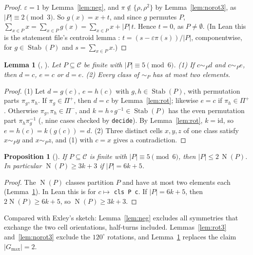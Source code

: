 \documentclass[11pt]{amsart}
\theoremstyle{plain}
\newtheorem{lemma}[theorem]{Lemma}
\newtheorem{proposition}[theorem]{Proposition}
\theoremstyle{definition}
\newcommand{\C}{\mathcal{C}}
\newcommand{\Stab}{\operatorname{Stab}}
\newcommand{\cls}{\operatorname{N}}
\begin{document}
\begin{proof}
$\varepsilon=1$ by Lemma~\ref{lem:neg}, and $\pi\notin\{\rho,\rho^2\}$ by Lemma~\ref{lem:norot3}, as $|P|\equiv2\pmod3$. So $g(x)=x+t$, and since $g$ permutes $P$, $\sum_{x\in P}x=\sum_{x\in P}g(x)=\sum_{x\in P}x+|P|\,t$. Hence $t=0$, as $P\neq\emptyset$. (In Lean this is the statement file's centroid lemma : $t=(s-\varepsilon\pi(s))/|P|$, componentwise, for $g\in\Stab(P)$ and $s=\sum_{x\in P}x$.)
\end{proof}

\begin{lemma}[, ]\label{lem:three}
Let $P\subseteq\C$ be finite with $|P|\equiv5\pmod6$. (1) If $c\sim_P d$ and $c\sim_P e$, then $d=c$, $e=c$ or $d=e$. (2) Every class of $\sim_P$ has at most two elements.
\end{lemma}

\begin{proof}
(1) Let $d=g(c)$, $e=h(c)$ with $g,h\in\Stab(P)$, with permutation parts $\pi_g,\pi_h$. If $\pi_g\in\Pi^+$, then $d=c$ by Lemma~\ref{lem:rot}; likewise $e=c$ if $\pi_h\in\Pi^+$. Otherwise $\pi_g,\pi_h\in\Pi^-$, and $k=h\circ g^{-1}\in\Stab(P)$ has the even permutation part $\pi_h\pi_g^{-1}$ (, nine cases checked by \texttt{decide}). By Lemma~\ref{lem:rot}, $k=\mathrm{id}$, so $e=h(c)=k(g(c))=d$.
(2) Three distinct cells $x,y,z$ of one class satisfy $x\sim_P y$ and $x\sim_P z$, and (1) with $c=x$ gives a contradiction.
\end{proof}

\begin{proposition}[]\label{prop:lower}
If $P\subseteq\C$ is finite with $|P|\equiv5\pmod6$, then $|P|\le2\,\cls(P)$. In particular $\cls(P)\ge3k+3$ if $|P|=6k+5$.
\end{proposition}

\begin{proof}
The $\cls(P)$ classes partition $P$ and have at most two elements each (Lemma~\ref{lem:three}). In Lean this is  for $c\mapsto$ \texttt{cls P c}. If $|P|=6k+5$, then $2\cls(P)\ge6k+5$, so $\cls(P)\ge3k+3$.
\end{proof}

Compared with Exley's sketch: Lemma~\ref{lem:neg} excludes all symmetries that exchange the two cell orientations, half-turns included. Lemmas~\ref{lem:rot3} and~\ref{lem:norot3} exclude the $120^\circ$ rotations, and Lemma~\ref{lem:three} replaces the claim $|G_{\max}|=2$.
\end{document}
